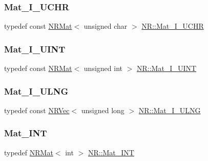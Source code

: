 \mbox{\label{namespaceNR_a0c5678809943e339bc2b0c0b57420a15}} 
\subsubsection{\texorpdfstring{Mat\_I\_UCHR}{Mat\_I\_UCHR}}
{\footnotesize\ttfamily typedef const \mbox{\hyperlink{classNR_1_1NRMat}{N\+R\+Mat}}$<$ unsigned char $>$ \mbox{\hyperlink{namespaceNR_a0c5678809943e339bc2b0c0b57420a15}{N\+R\+::\+Mat\+\_\+\+I\+\_\+\+U\+C\+HR}}}

\mbox{\label{namespaceNR_af959eaecb622b961ae87ec7258f0fda3}} 
\subsubsection{\texorpdfstring{Mat\_I\_UINT}{Mat\_I\_UINT}}
{\footnotesize\ttfamily typedef const \mbox{\hyperlink{classNR_1_1NRMat}{N\+R\+Mat}}$<$ unsigned int $>$ \mbox{\hyperlink{namespaceNR_af959eaecb622b961ae87ec7258f0fda3}{N\+R\+::\+Mat\+\_\+\+I\+\_\+\+U\+I\+NT}}}

\mbox{\label{namespaceNR_ab203ca7a3abe14655f8d67302282a7d8}} 
\subsubsection{\texorpdfstring{Mat\_I\_ULNG}{Mat\_I\_ULNG}}
{\footnotesize\ttfamily typedef const \mbox{\hyperlink{classNR_1_1NRVec}{N\+R\+Vec}}$<$ unsigned long $>$ \mbox{\hyperlink{namespaceNR_ab203ca7a3abe14655f8d67302282a7d8}{N\+R\+::\+Mat\+\_\+\+I\+\_\+\+U\+L\+NG}}}

\mbox{\label{namespaceNR_ae015c8943548619daec89e8309eefee7}} 
\subsubsection{\texorpdfstring{Mat\_INT}{Mat\_INT}}
{\footnotesize\ttfamily typedef \mbox{\hyperlink{classNR_1_1NRMat}{N\+R\+Mat}}$<$ int $>$ \mbox{\hyperlink{namespaceNR_ae015c8943548619daec89e8309eefee7}{N\+R\+::\+Mat\+\_\+\+I\+NT}}}

